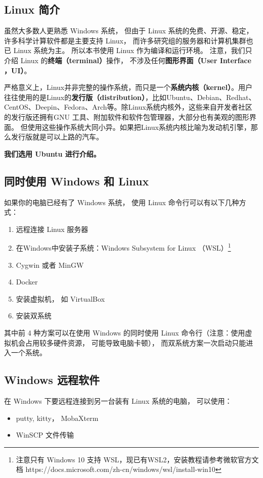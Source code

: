 
\begin{issues}
\issueTODO
\end{issues}

\subsection{Linux 简介}
虽然大多数人更熟悉 Windows 系统， 但由于 Linux 系统的免费、开源、稳定， 许多科学计算软件都是主要支持 Linux， 而许多研究组的服务器和计算机集群也已 Linux 系统为主。 所以本书使用 Linux 作为编译和运行环境。 注意，我们只介绍 Linux 的\textbf{终端（terminal）}操作， 不涉及任何\textbf{图形界面（User Interface ，UI）}。 

严格意义上，Linux并非完整的操作系统，而只是一个\textbf{系统内核（kernel）}。用户往往使用的是Linux的\textbf{发行版（distribution）}，比如Ubuntu、Debian、Redhat、CentOS、Deepin、Fedora、Arch等。除Linux系统内核外，这些来自开发者社区的发行版还拥有GNU 工具、附加软件和软件包管理器，大部分也有美观的图形界面。 但使用这些操作系统大同小异。如果把Linux系统内核比喻为发动机引擎，那么发行版就是可以上路的汽车。

\textbf{我们选用 Ubuntu 进行介绍。}


\subsection{同时使用 Windows 和 Linux}
如果你的电脑已经有了 Windows 系统， 使用 Linux 命令行可以有以下几种方式：
\begin{enumerate}
\item 远程连接 Linux 服务器
\item 在Windows中安装子系统：Windows Subsystem for Linux （WSL）\footnote{注意只有 Windows 10 支持 WSL，现已有WSL2，安装教程请参考微软官方文档 https://docs.microsoft.com/zh-cn/windows/wsl/install-win10} 
\item Cygwin 或者 MinGW
\item Docker
\item 安装虚拟机， 如 VirtualBox
\item 安装双系统
\end{enumerate}
其中前 4 种方案可以在使用 Windows 的同时使用 Linux 命令行（注意：使用虚拟机会占用较多硬件资源， 可能导致电脑卡顿）， 而双系统方案一次启动只能进入一个系统。

\subsection{Windows 远程软件}
在 Windows 下要远程连接到另一台装有 Linux 系统的电脑， 可以使用：
\begin{itemize}
\item putty, kitty， MobaXterm
\item WinSCP 文件传输
\end{itemize}


